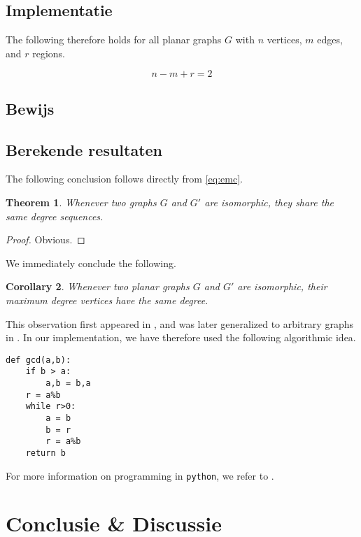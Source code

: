 \documentclass[twoside]{article}
\newtheorem{theorem}{Theorem}[section]
\newtheorem{corollary}[theorem]{Corollary}
\begin{document}
\begin{multicols}{2}
\lipsum[5] %

\subsection{Implementatie}
\lipsum[1]
The following therefore holds for all
planar graphs $G$ with $n$ vertices, $m$ edges, and $r$ regions.

\begin{equation}
\label{eq:emc}
n-m+r=2
\end{equation}

\subsection{Bewijs}

\subsection{Berekende resultaten}

The following conclusion follows directly from \eqref{eq:emc}.
\lipsum[6] %
\begin{theorem}
Whenever two graphs $G$ and $G'$ are isomorphic, they share the same degree sequences.
\end{theorem}
\begin{proof}
Obvious.
\end{proof}
We immediately conclude the following.
\begin{corollary}
Whenever two planar graphs $G$ and $G'$ are isomorphic, their maximum degree vertices have the same degree. 
\end{corollary}
This observation first appeared in , and was later generalized to arbitrary graphs in .
In our implementation, we have therefore used the following algorithmic idea.
\begin{verbatim}
def gcd(a,b):
    if b > a:
        a,b = b,a
    r = a%b
    while r>0:
        a = b
        b = r
        r = a%b
    return b
\end{verbatim}
For more information on programming in {\tt python}, we refer to\cite{jaco} \cite{MR0403320}.

\section{Conclusie \& Discussie}


\lipsum[8] %


 




\end{multicols}
\end{document}
